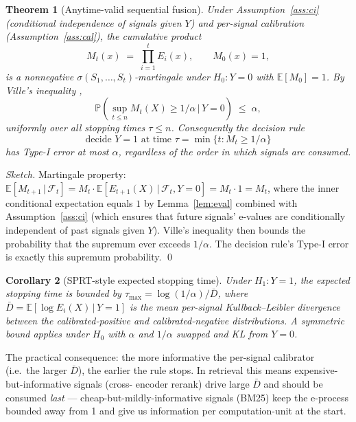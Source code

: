 \documentclass[11pt]{article}
\newtheorem{theorem}{Theorem}
\newtheorem{corollary}[theorem]{Corollary}
\theoremstyle{definition}
\theoremstyle{remark}
\newcommand{\pr}{\mathbb{P}}
\newcommand{\expec}{\mathbb{E}}
\newcommand{\given}{\,\big|\,}
\begin{document}
\begin{theorem}[Anytime-valid sequential fusion]\label{thm:eprocess}
Under Assumption~\ref{ass:ci} (conditional independence of signals
given $Y$) and per-signal calibration (Assumption~\ref{ass:cal}), the
cumulative product
\[
  M_t(x) \;=\; \prod_{i=1}^t E_i(x),
  \qquad M_0(x) = 1,
\]
is a nonnegative $\sigma(S_1, \ldots, S_t)$-martingale under $H_0: Y = 0$
with $\expec[M_0] = 1$. By Ville's inequality
\citep{ville1939,howard2021timeuniform},
\[
  \pr\!\left( \sup_{t \leq n} M_t(X) \geq 1/\alpha \,\Big|\, Y = 0 \right)
  \;\leq\; \alpha,
\]
uniformly over all stopping times $\tau \leq n$. Consequently the
decision rule
\[
  \text{decide $Y = 1$ at time $\tau = \min\{t : M_t \geq 1/\alpha\}$}
\]
has Type-I error at most $\alpha$, regardless of the order in which
signals are consumed.
\end{theorem}

\begin{proof}[Sketch]
Martingale property: $\expec[M_{t+1} \given \mathcal{F}_t] = M_t \cdot \expec[E_{t+1}(X) \given \mathcal{F}_t, Y=0] = M_t \cdot 1 = M_t$,
where the inner conditional expectation equals $1$ by
Lemma~\ref{lem:eval} combined with Assumption~\ref{ass:ci} (which
ensures that future signals' e-values are conditionally independent
of past signals given $Y$). Ville's inequality then bounds the
probability that the supremum ever exceeds $1/\alpha$. The decision
rule's Type-I error is exactly this supremum probability. \qed
\end{proof}

\begin{corollary}[SPRT-style expected stopping time]\label{cor:sprt}
Under $H_1: Y = 1$, the expected stopping time is bounded by
$\tau_{\max} = \log(1/\alpha) / \bar{D}$, where
$\bar{D} = \expec[\log E_i(X) \given Y = 1]$ is the mean per-signal
Kullback--Leibler divergence between the calibrated-positive and
calibrated-negative distributions. A symmetric bound applies under
$H_0$ with $\alpha$ and $1/\alpha$ swapped and KL from $Y=0$.
\end{corollary}

The practical consequence: the more informative the per-signal
calibrator (i.e.\ the larger $\bar{D}$), the earlier the rule stops.
In retrieval this means expensive-but-informative signals (cross-
encoder rerank) drive large $\bar{D}$ and should be consumed
\emph{last} --- cheap-but-mildly-informative signals (BM25) keep
the e-process bounded away from 1 and give us information per
computation-unit at the start.
\end{document}
